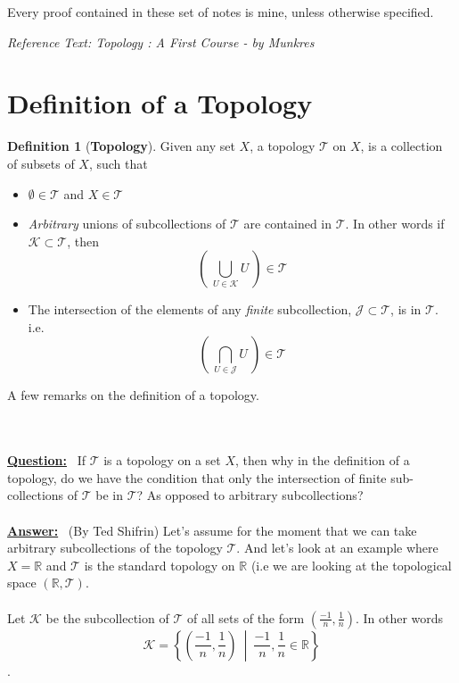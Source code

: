 \documentclass{article}
\theoremstyle{remark}
\theoremstyle{definition}
\newtheorem{definition}{Definition}[section]
\begin{document}
\begin{flushleft}
Every proof contained in these set of notes is mine, unless otherwise specified.

\end{flushleft}


\begin{flushleft}
\textit{Reference Text: Topology : A First Course - by Munkres}

\end{flushleft}

\newpage

\section{Definition of a Topology}
\bigskip
\begin{definition}[\textbf{Topology}]
Given any set $X$, a topology $\mathcal{T}$ on $X$, is a collection of subsets of $X$, such that

\begin{itemize}
  \item $\emptyset \in \mathcal{T}$ and $X \in \mathcal{T}$
  \item \textit{Arbitrary} unions of subcollections of $\mathcal{T}$ are contained in $\mathcal{T}$. In other words if $\mathcal{K} \subset \mathcal{T}$, then $$\left( \ \bigcup_{U \in \mathcal{K}}U \ \right) \in \mathcal{T}$$
  \item The intersection of the elements of any \textit{finite} subcollection, $\mathcal{J} \subset \mathcal{T}$, is in $\mathcal{T}$. i.e. $$\left( \ \bigcap_{U \in \mathcal{J}}U \ \right) \in \mathcal{T}$$
\end{itemize}
\end{definition}

\bigskip
\hrulefill
\medskip
\begin{flushleft}
A few remarks on the definition of a topology. 
\end{flushleft}
\\ \\
\textbf{\underline{Question:}} 
\ If $\mathcal{T}$ is a topology on a set $X$, then why in the definition of a topology, do we have the condition that only the intersection of finite sub-collections of $\mathcal{T}$ be in $\mathcal{T}$? As opposed to arbitrary subcollections?
\\ \\
\textbf{\underline{Answer:}}  
\ (By Ted Shifrin) Let's assume for the moment that we can take arbitrary subcollections of the topology $\mathcal{T}$. And let's look at an example where $X = \mathbb{R}$ and $\mathcal{T}$ is the standard topology on $\mathbb{R}$ (i.e we are looking at the topological space $(\mathbb{R}, \mathcal{T})$.
\\ \\
Let $\mathcal{K}$ be the subcollection of $\mathcal{T}$ of all sets of the form $(\frac{-1}{n}, \frac{1}{n})$. In other words $$\mathcal{K} = \left\{\left(\frac{-1}{n}, \frac{1}{n}\right) \ \middle| \ \frac{-1}{n}, \frac{1}{n} \in \mathbb{R}\right\}$$.
\end{document}
